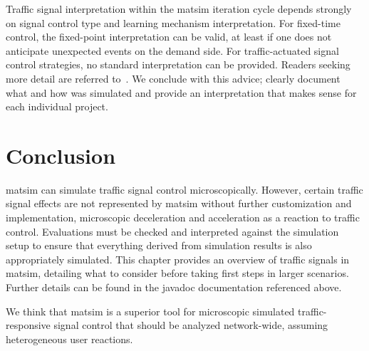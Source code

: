 Traffic signal interpretation within the \gls{matsim} iteration cycle depends strongly on signal control type and learning mechanism interpretation. 
For fixed-time control, the fixed-point interpretation can be valid, at least if one does not anticipate  unexpected events on the demand side. 
For traffic-actuated signal control strategies, no standard interpretation can be provided. 
Readers seeking more detail are referred to~\citet[][pp.~75]{Grether2014PhD}.  
We conclude with this advice; clearly document what and how was simulated and provide an interpretation that makes sense for each individual project.    

\section{Conclusion} 
\label{sec:signals_evaluation_conclusion}
\gls{matsim} can simulate traffic signal control microscopically. 
However, certain traffic signal effects are not represented by \gls{matsim} without further customization and implementation, \eg microscopic deceleration and acceleration as a reaction to traffic control. Evaluations must be checked and interpreted against the simulation setup to ensure that everything derived from simulation results is also appropriately simulated.  
This chapter provides an overview of traffic signals in \gls{matsim}, detailing what to consider before taking first steps in larger scenarios. Further details can be found in the \gls{javadoc} documentation referenced above. 

We think that \gls{matsim} is a superior tool for microscopic simulated traffic-responsive signal control that should be analyzed network-wide, assuming heterogeneous user reactions. 

 
